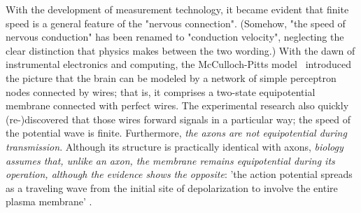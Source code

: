 With the development of measurement technology, it became evident
that finite speed is a general feature of the "nervous connection".
(Somehow, "the speed of nervous conduction" has been renamed to
"conduction velocity", neglecting the clear distinction that physics
makes between the two wording.) With the dawn of instrumental electronics
and computing, the McCulloch-Pitts model~\cite{LogicalCalculusMcCulloch:1943}
introduced the picture that the brain can be modeled by a network
of simple perceptron nodes connected by wires; that is, it comprises
a two-state equipotential membrane connected with perfect wires. The
experimental research also quickly (re-)discovered that those wires
forward signals in a particular way; the speed of the potential wave
is finite.
Furthermore, \textit{the axons are not equipotential during transmission}.
Although its structure is practically identical with axons, \textit{biology
assumes that, unlike an axon, the membrane remains equipotential during
its operation, although the evidence shows the opposite}: 'the action potential spreads as a traveling wave from the initial site of depolarization
to involve the entire plasma membrane' \cite{MolecularBiology:2002}.

